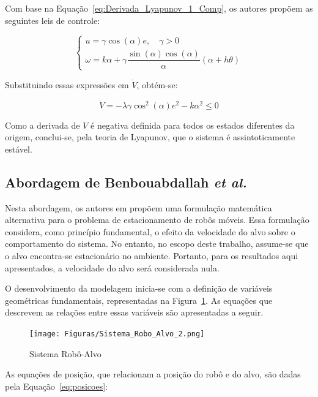 \documentclass[conference]{IEEEtran}
\begin{document}
Com base na Equação~\ref{eq:Derivada_Lyapunov_1_Comp}, os autores propõem as seguintes leis de controle:

\begin{equation}
    \begin{cases}
        u = \gamma\cos(\alpha)e, \quad \gamma > 0\\
        \omega = k\alpha + \gamma\dfrac{\sin(\alpha)\cos(\alpha)}{\alpha} (\alpha + h\theta)
    \end{cases}
    \label{eq:Leis_de_controle_1}
\end{equation}

Substituindo essas expressões em $\dot{V}$, obtém-se:

\begin{equation}
    \dot{V} = -\lambda \gamma \cos^2(\alpha) e^2 - k\alpha^2 \leq 0
\end{equation}

Como a derivada de $V$ é negativa definida para todos os estados diferentes da origem, conclui-se, pela teoria de Lyapunov, que o sistema é assintoticamente estável.

\subsection{Abordagem de Benbouabdallah \textit{et al.}}

Nesta abordagem, os autores em \cite{b2} propõem uma formulação matemática alternativa para o problema de estacionamento de robôs móveis. Essa formulação considera, como princípio fundamental, o efeito da velocidade do alvo sobre o comportamento do sistema. No entanto, no escopo deste trabalho, assume-se que o alvo encontra-se estacionário no ambiente. Portanto, para os resultados aqui apresentados, a velocidade do alvo será considerada nula.

O desenvolvimento da modelagem inicia-se com a definição de variáveis geométricas fundamentais, representadas na Figura~\ref{fig:Sistema_Robo_Alvo_2}. As equações que descrevem as relações entre essas variáveis são apresentadas a seguir.

\begin{figure}[h!]
    \centering
    \texttt{[image: Figuras/Sistema\_Robo\_Alvo\_2.png]}
    \caption{Sistema Robô-Alvo}
    \label{fig:Sistema_Robo_Alvo_2}
\end{figure}

As equações de posição, que relacionam a posição do robô e do alvo, são dadas pela Equação~\ref{eq:posicoes}:
\end{document}
